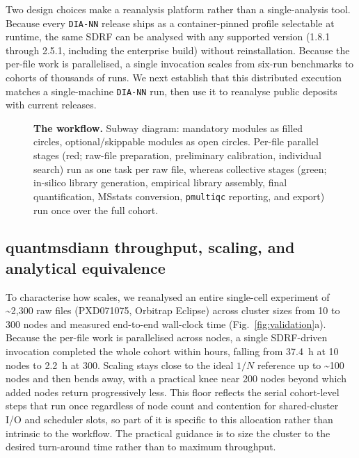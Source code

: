 \documentclass[preprint,12pt]{elsarticle}
\begin{document}
Two design choices make \quantmsdiann{} a reanalysis platform rather than a single-analysis tool. Because every \texttt{DIA-NN} release ships as a container-pinned profile selectable at runtime, the same SDRF can be analysed with any supported version (1.8.1 through 2.5.1, including the enterprise build) without reinstallation. Because the per-file work is parallelised, a single invocation scales from six-run benchmarks to cohorts of thousands of runs. We next establish that this distributed execution matches a single-machine \texttt{DIA-NN} run, then use it to reanalyse public deposits with current releases.

\begin{figure}[htbp]
  \centering
  \caption[The quantmsdiann workflow]{%
    \textbf{The \quantmsdiann{} workflow.} Subway diagram: mandatory modules as
    filled circles, optional/skippable modules as open circles. Per-file parallel
    stages (red; raw-file preparation, preliminary calibration, individual search)
    run as one task per raw file, whereas collective stages (green; in-silico
    library generation, empirical library assembly, final quantification, MSstats
    conversion, \texttt{pmultiqc} reporting, and \qpx{} export) run once over the
    full cohort.
  }
  \label{fig:architecture}
\end{figure}

\subsection{quantmsdiann throughput, scaling, and analytical equivalence}
\label{sec:throughput}

To characterise how \quantmsdiann{} scales, we reanalysed an entire single-cell experiment of \textasciitilde 2{,}300 raw files (PXD071075, Orbitrap Eclipse) across cluster sizes from 10 to 300 nodes and measured end-to-end wall-clock time (Fig.~\ref{fig:validation}a). Because the per-file work is parallelised across nodes, a single SDRF-driven invocation completed the whole cohort within hours, falling from 37.4~h at 10 nodes to 2.2~h at 300. Scaling stays close to the ideal $1{/}N$ reference up to \textasciitilde 100 nodes and then bends away, with a practical knee near 200 nodes beyond which added nodes return progressively less. This floor reflects the serial cohort-level steps that run once regardless of node count and contention for shared-cluster I/O and scheduler slots, so part of it is specific to this allocation rather than intrinsic to the workflow. The practical guidance is to size the cluster to the desired turn-around time rather than to maximum throughput.
\end{document}
